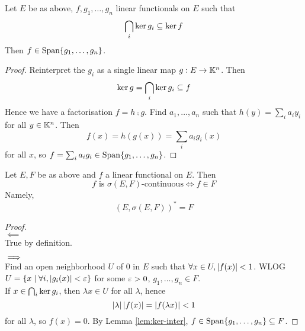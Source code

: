 \documentclass{article}
\begin{document}
\begin{nlemma}\label{lem:ker-inter}
  Let $E$ be as above, $f, g_1, \dots, g_n$ linear functionals on $E$ such that
  $$\bigcap_i \ker g_i \subseteq \ker f$$
  Then $f \in \operatorname{Span} \{g_1, \dots, g_n\}$.
\end{nlemma}
\begin{proof}
  Reinterpret the $g_i$ as a single linear map $g : E \rightarrow \mathbb K^n$. Then
  $$\ker g = \bigcap_i \ker g_i \subseteq f$$
  Hence we have a factorisation $f = h \comp g$. Find $a_1, \dots, a_n$ such that $h(y) = \sum_i a_i y_i$ for all $y \in \mathbb K^n$. Then
  $$f(x) = h(g(x)) = \sum_i a_ig_i(x)$$
  for all $x$, so $f = \sum_i a_i g_i \in \operatorname{Span} \{g_1, \dots, g_n\}$.
\end{proof}

\begin{prop}
  Let $E, F$ be as above and $f$ a linear functional on $E$. Then
  $$f \text{ is } \sigma(E, F)\text{-continuous} \iff f \in F$$
  Namely,
  $$(E, \sigma(E, F))^* = F$$
\end{prop}
\begin{proof}~\\
  $\impliedby$ \\
  True by definition.
  
  $\implies$ \\
  Find an open neighborhood $U$ of $0$ in $E$ such that $\forall x \in U, \left\lvert f(x)\right\rvert < 1$. WLOG $U = \{x \mid \forall i, \left\lvert g_i(x)\right\rvert < \varepsilon\}$ for some $\varepsilon > 0$, $g_1, \dots, g_n \in F$. \\
  If $x \in \bigcap_i \ker g_i$, then $\lambda x \in U$ for all $\lambda$, hence
  $$\left\lvert \lambda\right\rvert\left\lvert f(x)\right\rvert = \left\lvert f(\lambda x)\right\rvert < 1$$
  for all $\lambda$, so $f(x) = 0$. By Lemma \ref{lem:ker-inter}, $f \in \operatorname{Span} \{g_1, \dots, g_n\} \subseteq F$.
\end{proof}
\end{document}
